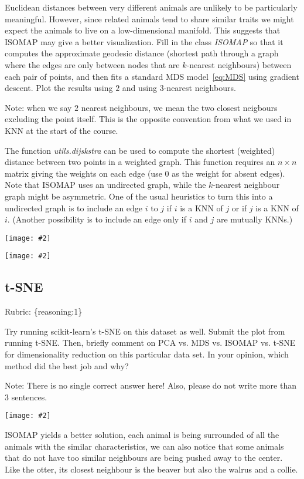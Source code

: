 \documentclass{article}
\def\rubric#1{\gre{Rubric: \{#1\}}}{}
\def\blu#1{{\color{blu}#1}}
\def\gre#1{{\color{gre}#1}}
\def\ans#1{{\color{ans}#1}}
\newcommand{\centerfig}[2]{\begin{center}\texttt{[image: \#2]}\end{center}}
\begin{document}
Euclidean distances between very different animals are unlikely to be particularly meaningful.
However, since related animals tend to share similar traits we might expect the animals to live on a low-dimensional manifold.
This suggests that ISOMAP may give a better visualization.
Fill in the class \emph{ISOMAP} so that it computes the approximate geodesic distance
(shortest path through a graph where the edges are only between nodes that are $k$-nearest neighbours) between each pair of points,
and then fits a standard MDS model~\eqref{eq:MDS} using gradient descent. \blu{Plot the results using $2$ and using $3$-nearest neighbours}.

Note: when we say $2$ nearest neighbours, we mean the two closest neigbours excluding the point itself. This is the opposite convention from what we used in KNN at the start of the course.

The function \emph{utils.dijskstra} can be used to compute the shortest (weighted) distance between two points in a weighted graph.
This function requires an $n \times n$ matrix giving the weights on each edge (use $0$ as the weight for absent edges).
Note that ISOMAP uses an undirected graph, while the $k$-nearest neighbour graph might be asymmetric.
One of the usual heuristics to turn this into a undirected graph is to include an edge $i$ to $j$ if $i$ is a KNN of $j$ or if $j$ is a KNN of $i$.
(Another possibility is to include an edge only if $i$ and $j$ are mutually KNNs.)
\centerfig{.5}{../figs/ISOMAP2_animals.png}
\centerfig{.5}{../figs/ISOMAP3_animals.png}

\subsection{t-SNE}
\rubric{reasoning:1}

Try running scikit-learn's t-SNE on this dataset as well. \blu{Submit the plot from running t-SNE. Then, briefly comment on PCA vs. MDS vs. ISOMAP vs. t-SNE for dimensionality reduction on this particular data set. In your opinion, which method did the best job and why?}

Note: There is no single correct answer here! Also, please do not write more than 3 sentences.
\centerfig{.5}{../figs/tsne_2_features.png}
\ans{
    ISOMAP yields a better solution, each animal is being surrounded of all the 
    animals with the similar characteristics, we can also notice that some animals that do not have  
    too similar neighbours are being pushed away to the center. Like the otter, its closest neighbour 
    is the beaver but also the walrus and a collie.
}
\end{document}
